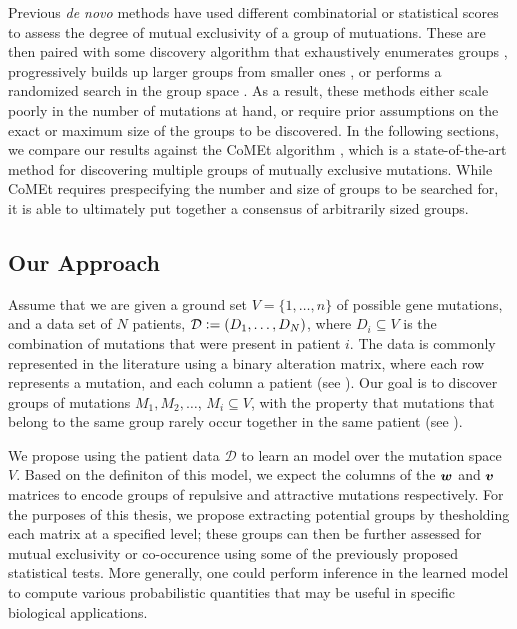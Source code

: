 Previous \emph{de novo} methods have used different combinatorial or statistical scores to assess the degree of mutual exclusivity of a group of mutuations.
These are then paired with some discovery algorithm that exhaustively enumerates groups \citep{muex,yeang08}, progressively builds up larger groups from smaller ones \citep{mutex,rme,memo,timex}, or performs a randomized search in the group space \citep{dendrix,multidendrix,comet}.
As a result, these methods either scale poorly in the number of mutations at hand, or require prior assumptions on the exact or maximum size of the groups to be discovered.
In the following sections, we compare our results against the CoMEt algorithm \citep{comet}, which is a state-of-the-art method for discovering multiple groups of mutually exclusive mutations.
While CoMEt requires prespecifying the number and size of groups to be searched for, it is able to ultimately put together a consensus of arbitrarily sized groups.

\subsection{Our Approach}
Assume that we are given a ground set $V = \{1,\ldots,n\}$ of possible gene mutations, and a data set of $N$ patients, $\mathcal{D} \vcentcolon= (D_1,\ldots,D_N)$, where $D_i \subseteq V$ is the combination of mutations that were present in patient $i$.
The data is commonly represented in the literature using a binary alteration matrix, where each row represents a mutation, and each column a patient (see ).
Our goal is to discover groups of mutations $M_1, M_2, \ldots$, $M_i \subseteq V$, with the property that mutations that belong to the same group rarely occur together in the same patient (see ).

We propose using the patient data $\mathcal{D}$ to learn an \fldc{} model over the mutation space $V$.
Based on the definiton of this model, we expect the columns of the $\bm{w}$ and $\bm{v}$ matrices to encode groups of repulsive and attractive mutations respectively.
For the purposes of this thesis, we propose extracting potential groups by thesholding each matrix at a specified level; these groups can then be further assessed for mutual exclusivity or co-occurence using some of the previously proposed statistical tests.
More generally, one could perform inference in the learned model to compute various probabilistic quantities that may be useful in specific biological applications.

